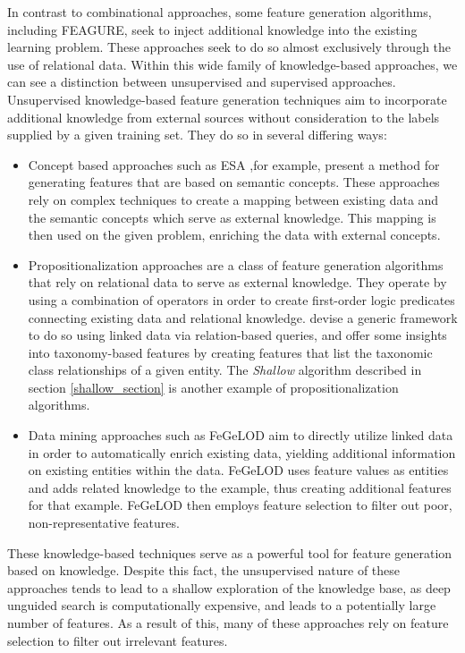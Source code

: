 \documentclass[twoside,11pt]{article}
\theoremstyle{definition}
\begin{document}
In contrast to combinational approaches, some feature generation algorithms, including FEAGURE, seek to inject additional knowledge into the existing learning problem. These approaches seek to do so almost exclusively through the use of relational data. 
Within this wide family of knowledge-based approaches, we can see a distinction between unsupervised and supervised approaches.
Unsupervised knowledge-based feature generation techniques aim to incorporate additional knowledge from external sources without consideration to the labels supplied by a given training set. They do so in several differing ways:
\begin{itemize}
	\item Concept based approaches such as ESA \cite{gabrilovich2009wikipediafull} ,for example, present a method for generating features that are based on semantic concepts. These approaches rely on complex techniques to create a mapping between existing data and the semantic concepts which serve as external knowledge. This mapping is then used on the given problem, enriching the data with external concepts.
	\item Propositionalization \cite{kramer2000bottom} approaches are a class of feature generation algorithms that rely on relational data to serve as external knowledge. They operate by using a combination of operators in order to create first-order logic predicates connecting existing data and relational knowledge. 
	 devise a generic framework to do so using linked data via relation-based queries, and offer some insights into taxonomy-based features by creating features that list the taxonomic class relationships of a given entity.
	The \emph{Shallow} algorithm described in section \ref{shallow_section} is another example of propositionalization algorithms.
	\item Data mining approaches such as FeGeLOD \cite{paulheim2012unsupervisedfull} aim to directly utilize linked data in order to automatically enrich existing data, yielding additional information on existing entities within the data. FeGeLOD uses feature values as entities and adds related knowledge to the example, thus creating additional features for that example. FeGeLOD then employs feature selection to filter out poor, non-representative features.
\end{itemize}
These knowledge-based techniques serve as a powerful tool for feature generation based on knowledge. Despite this fact, the unsupervised nature of these approaches tends to lead to a shallow exploration of the knowledge base, as deep unguided search is computationally expensive, and leads to a potentially large number of features. As a result of this, many of these approaches rely on feature selection to filter out irrelevant features.
\end{document}

